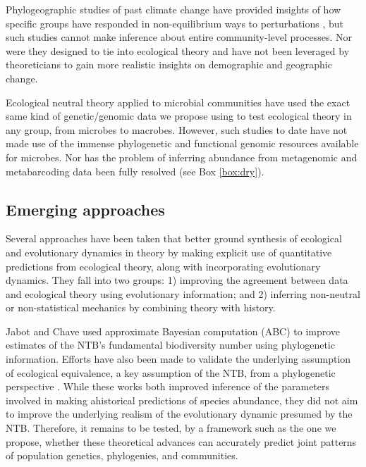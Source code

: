 \documentclass[12pt]{article}
\newcounter{Box}
\begin{document}
Phylogeographic studies of past climate change have provided insights
% 
% 
% 
of how specific groups have responded in non-equilibrium ways to
perturbations \citep{Arbogast2001-jx, Smith2012-db, Hickerson2005-ek,
  Satler2016-lb}, but such studies cannot make inference about entire
community-level processes. Nor were they designed to tie into
ecological theory and have not been leveraged by theoreticians to gain
more realistic insights on demographic and geographic change.

Ecological neutral theory applied to microbial communities
\citep{Venkataraman2015-rk} have used the exact same kind of
genetic/genomic data we propose using to test ecological theory
in any group, from microbes to macrobes. However, such studies to date
have not made use of the immense phylogenetic and functional genomic
resources available for microbes. Nor has the problem of inferring
abundance from metagenomic and metabarcoding data been fully resolved
(see Box \ref{box:dry}).

\subsection{Emerging approaches}

Several approaches have been taken that better ground synthesis of
ecological and evolutionary dynamics in theory by making
explicit use of quantitative predictions from ecological theory,
along with incorporating evolutionary dynamics. They
fall into two groups: 1) improving the agreement between data and
ecological theory using evolutionary information; and 2) inferring
non-neutral or non-statistical mechanics by combining theory with
history. 

Jabot and Chave \citep{Jabot2009-xr} used approximate Bayesian
computation (ABC) to improve estimates of the NTB's fundamental
% 
% 
biodiversity number using phylogenetic information. Efforts have also
been made to validate the underlying assumption of ecological
equivalence, a key assumption of the NTB, from a phylogenetic
perspective \citep{Burbrink2015-vx}. While these works both improved
inference of the parameters involved in making ahistorical predictions
of species abundance, they did not aim to improve the underlying
realism of the evolutionary dynamic presumed by the NTB. Therefore, it remains to be tested, by a
framework such as the one we propose, whether these theoretical
advances can accurately predict joint patterns of population genetics,
phylogenies, and communities.
\end{document}
